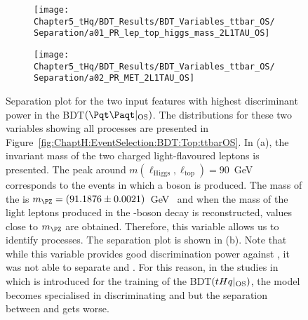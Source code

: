 

\begin{figure}[h]
\centering
\begin{subfigure}{.47\textwidth}
  \centering
  \texttt{[image: Chapter5\_tHq/BDT\_Results/BDT\_Variables\_ttbar\_OS/Separation/a01\_PR\_lep\_top\_higgs\_mass\_2L1TAU\_OS]}
\end{subfigure}%
\begin{subfigure}{.47\textwidth}
  \centering
  \texttt{[image: Chapter5\_tHq/BDT\_Results/BDT\_Variables\_ttbar\_OS/Separation/a02\_PR\_MET\_2L1TAU\_OS]}
\end{subfigure}
\caption{Separation plot for the two input features with highest discriminant power in the BDT$(\ttbar|_{\text{OS}})$.
The distributions for these two variables showing all processes are presented in Figure~\ref{fig:ChaptH:EventSelection:BDT:Top:ttbarOS}.
In (a), the invariant mass of the two charged light-flavoured leptons is presented.
The peak around $m(\ell_{\text{Higgs}}, \ell_{\text{top}})=90$~GeV corresponds to the events in which a 
\PZ boson is produced. The mass of the \PZ is $m_{\PZ} = (91.1876 \pm 0.0021)$~GeV~\cite{Workman:2022ynf} and %
when the mass of the light leptons produced in the \PZ-boson decay is reconstructed, values close
to $m_{\PZ}$ are obtained. Therefore, this variable allows us to identify \Zjets processes.
The \MET separation plot is shown in (b). Note that while this variable provides 
good discrimination power against \Zjets, it was not able to separate \ttbar and \tHq.
For this reason, in the studies in which \MET is introduced  for the training of the BDT$(tHq|_{\text{OS}})$,
the model becomes specialised in discriminating \tHq and \Zjets but the separation between 
\tHq and \ttbar gets worse.}
\label{fig:Appendix:BDTVARS:ttbarOS:BestTwo}
\end{figure}


